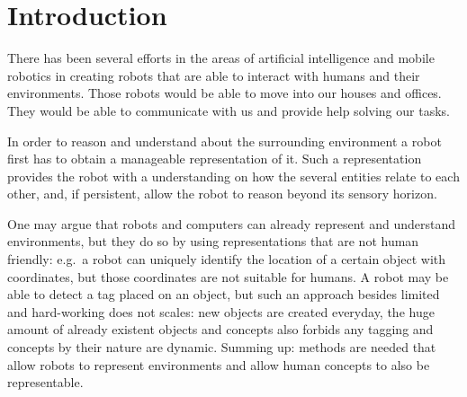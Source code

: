 \chapter{Introduction}

%

There has been several efforts in the areas of artificial intelligence and mobile robotics
in creating robots that are able to interact with humans and their environments.
Those robots would be able to move into our houses and offices. They would be able to communicate
with us and provide help solving our tasks.



In order to reason and understand about the surrounding environment a robot first has to
obtain a manageable representation of it.
Such a representation provides the robot with a understanding on how the several
entities relate to each other, and, if persistent, allow the robot to reason beyond its sensory
horizon.

One may argue that robots and computers can already represent and understand environments, but they
do so by using representations that are not human friendly: e.g.\ a robot can uniquely identify the
location of a certain object with coordinates, but those coordinates are not suitable for humans.
A robot may be able to detect a tag placed on an object, but such an approach besides limited
and hard-working does not scales: new objects are created everyday, the huge amount of already
existent objects and concepts also forbids any tagging and concepts by their nature are dynamic.
Summing up: methods are needed that allow robots to represent environments and allow human concepts
to also be representable.

